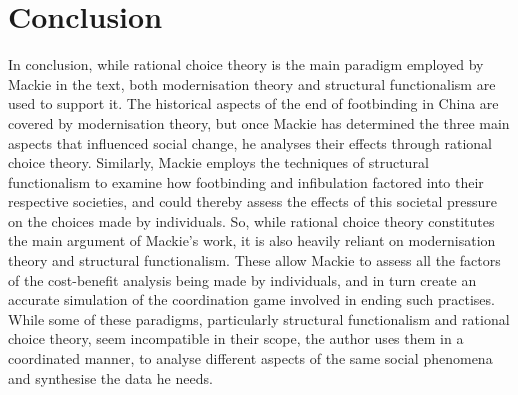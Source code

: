 \documentclass[twoside, 11pt]{article}
\begin{document}
\section*{Conclusion}
	In conclusion, while rational choice theory is the main paradigm employed by Mackie in the text,  both modernisation theory and structural functionalism are used to support it. The historical aspects of the end of footbinding in China are covered by modernisation theory, but once Mackie has determined the three main aspects that influenced social change, he analyses their effects through rational choice theory. Similarly, Mackie employs the techniques of structural functionalism to examine how footbinding and infibulation factored into their respective societies, and could thereby assess the effects of this societal pressure on the choices made by individuals. So, while rational choice theory constitutes the main argument of Mackie's work, it is also heavily reliant on modernisation theory and structural functionalism. These allow Mackie to assess all the factors of the cost-benefit analysis being made by individuals, and in turn create an accurate simulation of the coordination game involved in ending such practises. While some of these paradigms, particularly structural functionalism and rational choice theory, seem incompatible in their scope, the author uses them in a coordinated manner, to  analyse different aspects of the same social phenomena and synthesise the data he needs.
\newpage



\end{document}
